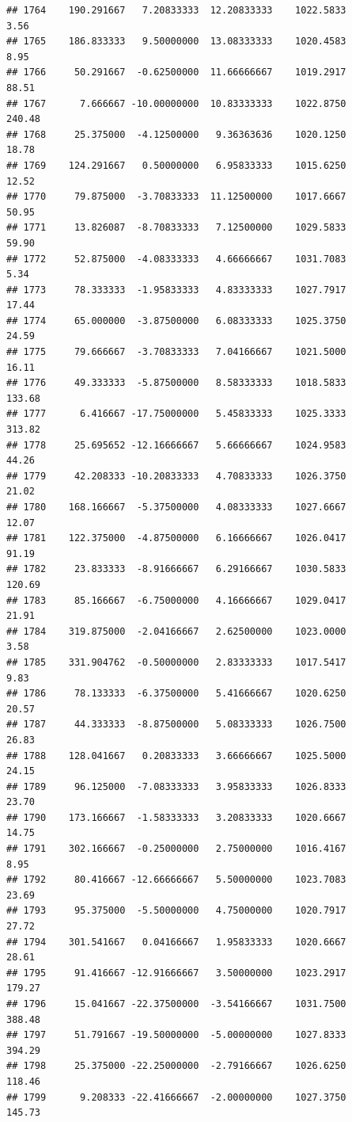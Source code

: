 \documentclass[
]{article}
\begin{document}
\begin{verbatim}
## 1764    190.291667   7.20833333  12.20833333    1022.5833        3.56
## 1765    186.833333   9.50000000  13.08333333    1020.4583        8.95
## 1766     50.291667  -0.62500000  11.66666667    1019.2917       88.51
## 1767      7.666667 -10.00000000  10.83333333    1022.8750      240.48
## 1768     25.375000  -4.12500000   9.36363636    1020.1250       18.78
## 1769    124.291667   0.50000000   6.95833333    1015.6250       12.52
## 1770     79.875000  -3.70833333  11.12500000    1017.6667       50.95
## 1771     13.826087  -8.70833333   7.12500000    1029.5833       59.90
## 1772     52.875000  -4.08333333   4.66666667    1031.7083        5.34
## 1773     78.333333  -1.95833333   4.83333333    1027.7917       17.44
## 1774     65.000000  -3.87500000   6.08333333    1025.3750       24.59
## 1775     79.666667  -3.70833333   7.04166667    1021.5000       16.11
## 1776     49.333333  -5.87500000   8.58333333    1018.5833      133.68
## 1777      6.416667 -17.75000000   5.45833333    1025.3333      313.82
## 1778     25.695652 -12.16666667   5.66666667    1024.9583       44.26
## 1779     42.208333 -10.20833333   4.70833333    1026.3750       21.02
## 1780    168.166667  -5.37500000   4.08333333    1027.6667       12.07
## 1781    122.375000  -4.87500000   6.16666667    1026.0417       91.19
## 1782     23.833333  -8.91666667   6.29166667    1030.5833      120.69
## 1783     85.166667  -6.75000000   4.16666667    1029.0417       21.91
## 1784    319.875000  -2.04166667   2.62500000    1023.0000        3.58
## 1785    331.904762  -0.50000000   2.83333333    1017.5417        9.83
## 1786     78.133333  -6.37500000   5.41666667    1020.6250       20.57
## 1787     44.333333  -8.87500000   5.08333333    1026.7500       26.83
## 1788    128.041667   0.20833333   3.66666667    1025.5000       24.15
## 1789     96.125000  -7.08333333   3.95833333    1026.8333       23.70
## 1790    173.166667  -1.58333333   3.20833333    1020.6667       14.75
## 1791    302.166667  -0.25000000   2.75000000    1016.4167        8.95
## 1792     80.416667 -12.66666667   5.50000000    1023.7083       23.69
## 1793     95.375000  -5.50000000   4.75000000    1020.7917       27.72
## 1794    301.541667   0.04166667   1.95833333    1020.6667       28.61
## 1795     91.416667 -12.91666667   3.50000000    1023.2917      179.27
## 1796     15.041667 -22.37500000  -3.54166667    1031.7500      388.48
## 1797     51.791667 -19.50000000  -5.00000000    1027.8333      394.29
## 1798     25.375000 -22.25000000  -2.79166667    1026.6250      118.46
## 1799      9.208333 -22.41666667  -2.00000000    1027.3750      145.73

\end{verbatim}
\end{document}

